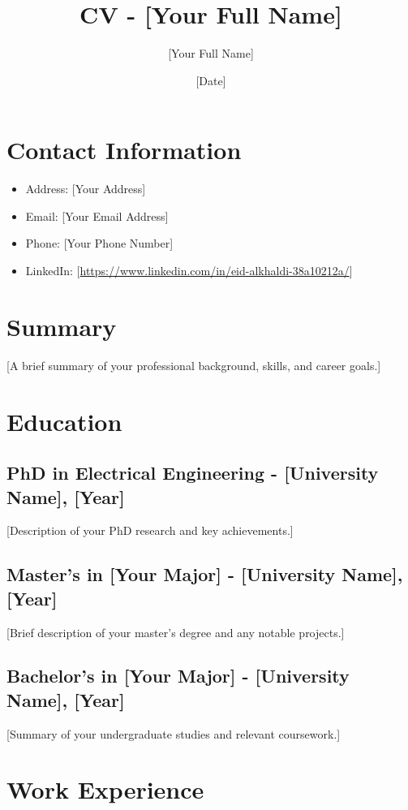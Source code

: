 \documentclass[font size, paper size, etc.]{article}
\author{[Your Full Name]}
\date{[Date]}
\title{CV - [Your Full Name]}
\begin{document}
\maketitle

\section{Contact Information}
\label{sec:orgf113875}
\begin{itemize}
\item Address: [Your Address]
\item Email: [Your Email Address]
\item Phone: [Your Phone Number]
\item LinkedIn: [\url{https://www.linkedin.com/in/eid-alkhaldi-38a10212a/}]
\end{itemize}

\section{Summary}
\label{sec:orga9daf93}
[A brief summary of your professional background, skills, and career goals.]

\section{Education}
\label{sec:org4dcc02c}
\subsection{PhD in Electrical Engineering - [University Name], [Year]}
\label{sec:org2d446db}
[Description of your PhD research and key achievements.]

\subsection{Master's in [Your Major] - [University Name], [Year]}
\label{sec:org71c243b}
[Brief description of your master's degree and any notable projects.]

\subsection{Bachelor's in [Your Major] - [University Name], [Year]}
\label{sec:org59ec2ab}
[Summary of your undergraduate studies and relevant coursework.]

\section{Work Experience}
\label{sec:orgcdb3d3b}
\end{document}
